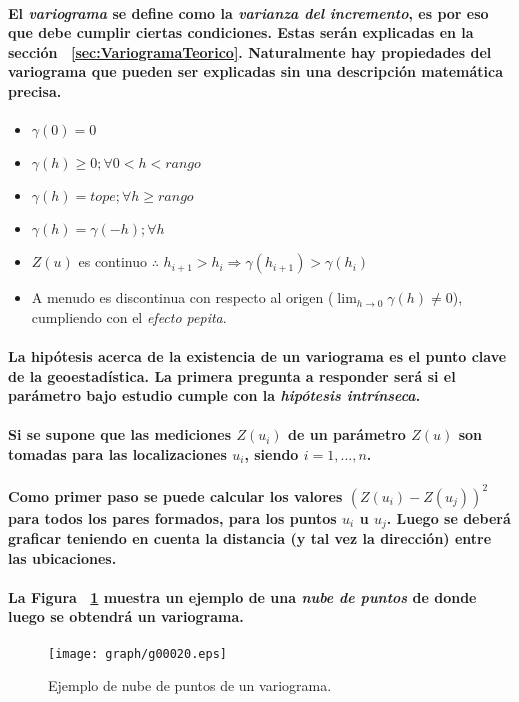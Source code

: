 \paragraph{
El \emph{variograma} se define como la \emph{varianza del incremento}, es por eso que debe cumplir ciertas condiciones. Estas serán explicadas en la sección ~\ref{sec:VariogramaTeorico}. Naturalmente hay propiedades  del variograma que pueden ser explicadas sin una descripción matemática precisa.
}
\begin{itemize}
\item $\gamma(0) = 0$
\item $\gamma(h) \ge 0; \forall 0 < h < rango$
\item $\gamma(h) = tope; \forall h \ge rango$
\item $\gamma(h) = \gamma(-h); \forall h$
\item $Z(u)$ es continuo $\therefore$ $h_{i+1} > h_i \Longrightarrow \gamma(h_{i+1}) > \gamma(h_i)$
\item A menudo es discontinua con respecto al origen ($\lim_{h \to 0} \gamma(h) \not = 0$), cumpliendo con el \emph{efecto pepita}\footnotemark[13].
\end{itemize}
\paragraph{
La hipótesis acerca de la existencia de un variograma es el punto clave de la geoestadística. La primera pregunta a responder será si el parámetro bajo estudio cumple con la \emph{hipótesis intrínseca}.
}
\paragraph{
Si se supone que las mediciones $Z(u_i)$ de un parámetro $Z(u)$ son tomadas para las localizaciones $u_i$, siendo $i = 1,...,n$.
}	
\paragraph{
Como primer paso se puede calcular los valores $(Z(u_i)-Z(u_j))^2$ para todos los pares formados, para los puntos $u_i$ u $u_j$. Luego se deberá graficar teniendo en cuenta la distancia (y tal vez la dirección) entre las ubicaciones.
}
\paragraph{
La Figura ~\ref{fig:NubeDePuntosDeLaDiferencia} muestra un ejemplo de una \emph{nube de puntos} de donde luego se obtendrá un variograma.
}
\begin{figure}[ht]
\centering
\texttt{[image: graph/g00020.eps]}
\caption[Nube de puntos de un variograma]{Ejemplo de nube de puntos de un variograma.}
\label{fig:NubeDePuntosDeLaDiferencia}
\end{figure}
